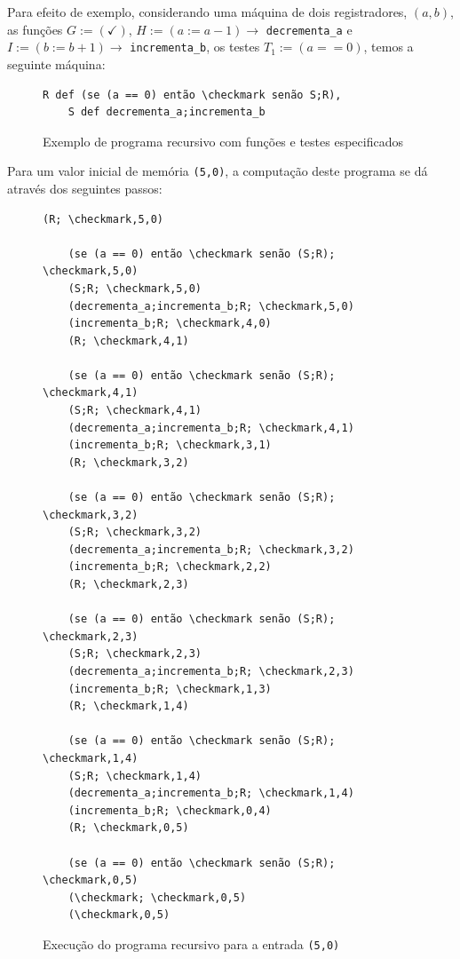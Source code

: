 \documentclass[12pt,fleqn]{article}
\begin{document}
Para efeito de exemplo, considerando uma máquina de dois registradores, $(a,b)$,
as funções $G := (\checkmark)$, $H := (a := a-1) \rightarrow$
\verb|decrementa_a| e $I := (b := b+1) \rightarrow$ \verb|incrementa_b|, os
testes $T_1 := (a == 0)$, temos a seguinte máquina:

\begin{figure}[H]
\begin{Verbatim}[commandchars=\\\{\},codes={\catcode`\$=3\catcode`\^=7}]
    R def (se (a == 0) então \checkmark senão S;R),
    S def decrementa_a;incrementa_b
\end{Verbatim}
\caption{Exemplo de programa recursivo com funções e testes especificados}
\end{figure}

\noindent
Para um valor inicial de memória \verb|(5,0)|, a computação deste programa se
dá através dos seguintes passos:

\begin{figure}[H]
\begin{Verbatim}[commandchars=\\\{\},codes={\catcode`\$=3\catcode`\^=7}]
    (R; \checkmark,5,0)

    (se (a == 0) então \checkmark senão (S;R); \checkmark,5,0)
    (S;R; \checkmark,5,0)
    (decrementa_a;incrementa_b;R; \checkmark,5,0)
    (incrementa_b;R; \checkmark,4,0)
    (R; \checkmark,4,1)

    (se (a == 0) então \checkmark senão (S;R); \checkmark,4,1)
    (S;R; \checkmark,4,1)
    (decrementa_a;incrementa_b;R; \checkmark,4,1)
    (incrementa_b;R; \checkmark,3,1)
    (R; \checkmark,3,2)

    (se (a == 0) então \checkmark senão (S;R); \checkmark,3,2)
    (S;R; \checkmark,3,2)
    (decrementa_a;incrementa_b;R; \checkmark,3,2)
    (incrementa_b;R; \checkmark,2,2)
    (R; \checkmark,2,3)

    (se (a == 0) então \checkmark senão (S;R); \checkmark,2,3)
    (S;R; \checkmark,2,3)
    (decrementa_a;incrementa_b;R; \checkmark,2,3)
    (incrementa_b;R; \checkmark,1,3)
    (R; \checkmark,1,4)

    (se (a == 0) então \checkmark senão (S;R); \checkmark,1,4)
    (S;R; \checkmark,1,4)
    (decrementa_a;incrementa_b;R; \checkmark,1,4)
    (incrementa_b;R; \checkmark,0,4)
    (R; \checkmark,0,5)

    (se (a == 0) então \checkmark senão (S;R); \checkmark,0,5)
    (\checkmark; \checkmark,0,5)
    (\checkmark,0,5)
\end{Verbatim}
\caption{Execução do programa recursivo para a entrada \texttt{(5,0)}}
\end{figure}
\end{document}
